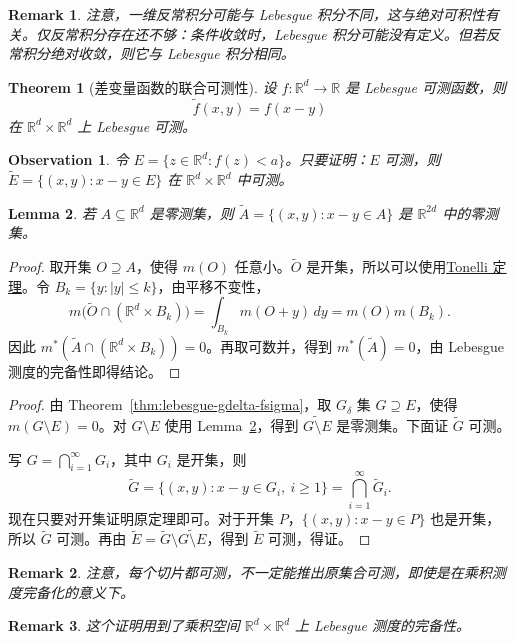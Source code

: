 \documentclass[12pt,letterpaper,twoside,openright]{ctexbook}
\theoremstyle{bluehead}
\newtheorem{theorem}{Theorem}
\newtheorem{lemma}[theorem]{Lemma}
\theoremstyle{olivehead}
\theoremstyle{orangehead}
\theoremstyle{redremark}
\newtheorem*{remark}{Remark}
\newtheorem*{observation}{Observation}
\begin{document}
\begin{remark}
注意，一维反常积分可能与 Lebesgue 积分不同，这与绝对可积性有关。仅反常积分存在还不够：条件收敛时，Lebesgue 积分可能没有定义。但若反常积分绝对收敛，则它与 Lebesgue 积分相同。
\end{remark}


\begin{theorem}[差变量函数的联合可测性]
设 $f:\mathbb R^d\to\mathbb R$ 是 Lebesgue 可测函数，则
\[
\widetilde f(x,y)=f(x-y)
\]
在 $\mathbb R^d\times\mathbb R^d$ 上 Lebesgue 可测。
\end{theorem}
\begin{observation}
令 $E=\{z\in\mathbb R^d:f(z)<a\}$。只要证明：$E$ 可测，则 $\widetilde E=\{(x,y):x-y\in E\}$ 在 $\mathbb R^d\times\mathbb R^d$ 中可测。
\end{observation}

\begin{lemma}\label{lem:difference-null-preimage}
\noindent 若 $A\subseteq\mathbb R^d$ 是零测集，则 $\widetilde A=\{(x,y):x-y\in A\}$ 是 $\mathbb R^{2d}$ 中的零测集。
\end{lemma}

\begin{proof}
取开集 $O\supseteq A$，使得 $m(O)$ 任意小。$\widetilde O$ 是开集，所以可以使用\hyperref[thm:tonelli-general]{Tonelli 定理}。令 $B_k=\{y:|y|\leq k\}$，由平移不变性，
\[
m\bigl(\widetilde O\cap(\mathbb R^d\times B_k)\bigr)
=\int_{B_k}m(O+y)\,dy=m(O)m(B_k).
\]
因此 $m^*(\widetilde A\cap(\mathbb R^d\times B_k))=0$。再取可数并，得到 $m^*(\widetilde A)=0$，由 Lebesgue 测度的完备性即得结论。
\end{proof}

\begin{proof}
由 Theorem~\ref{thm:lebesgue-gdelta-fsigma}，取 $G_\delta$ 集 $G\supseteq E$，使得 $m(G\setminus E)=0$。对 $G\setminus E$ 使用 Lemma~\ref{lem:difference-null-preimage}，得到 $\widetilde{G\setminus E}$ 是零测集。下面证 $\widetilde G$ 可测。

写 $G=\bigcap_{i=1}^{\infty}G_i$，其中 $G_i$ 是开集，则
\[
\widetilde G=\{(x,y):x-y\in G_i,\ i\geq1\}
=\bigcap_{i=1}^{\infty}\widetilde G_i.
\]
现在只要对开集证明原定理即可。对于开集 $P$，$\{(x,y):x-y\in P\}$ 也是开集，所以 $\widetilde G$ 可测。再由 $\widetilde E=\widetilde G\setminus\widetilde{G\setminus E}$，得到 $\widetilde E$ 可测，得证。
\end{proof}

\begin{remark}
注意，每个切片都可测，不一定能推出原集合可测，即使是在乘积测度完备化的意义下。
\end{remark}
\begin{remark}
这个证明用到了乘积空间 $\mathbb R^d\times\mathbb R^d$ 上 Lebesgue 测度的完备性。
\end{remark}
\end{document}
